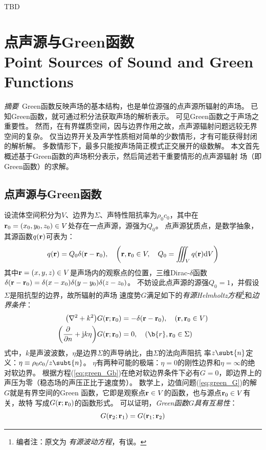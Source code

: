 \documentclass[UTF8]{ctexbook}
\begin{document}
 TBD




\section{点声源与Green函数\\
Point Sources of Sound and Green Functions}

\emph{摘要}\ 
Green函数反映声场的基本结构，也是单位源强的点声源所辐射的声场。
已知Green函数，就可通过积分法获取声场的解析表示。
可见Green函数之于声场之重要性。
然而，在有界媒质空间，因与边界作用之故，点声源辐射问题远较无界空间的复杂。
仅当边界开关及声学性质相对简单的少数情形，才有可能获得封闭的解析解。
多数情形下，最多只能按声场简正模式正交展开的级数解。
本文首先概述基于Green函数的声场积分表示，然后简述若干重要情形的点声源辐射
场（即Green函数）的求解。

\subsection{点声源与Green函数}
设流体空间积分为$V$、边界为$\Sigma$、声特性阻抗率为$\rho_0c_0$，其中在
$\vb{r}_0=(x_0,y_0,z_0)\in V$处存在一点声源，源强为$Q_0$。
点声源犹质点，是数学抽象，其源函数$q(\vb{r})$可表为：
$$q(\vb{r}) = Q_0 \delta(\vb{r}-\vb{r}_0)\qc
\qty(\vb{r},\vb{r}_0\in V\qc Q_0 = \iiint_V q(\vb{r})\dd V)$$
其中$\vb{r}=(x,y,z)\in V$是声场内的观察点的位置，三维Dirac-$\delta$函数
$\delta(\vb{r}-\vb{r}_0)= \delta(x-x_0)\delta(y-y_0)\delta(z-z_0)$。
不妨设此点声源的源强$Q_0=1$，并假设$\Sigma$是阻抗型的边界，故所辐射的声场
速度势$G$满足如下的\emph{有源Helmholtz方程}\footnote{编者注：原文为\emph{
	有源波动方程}，有误。}和\emph{边界条件}：
\begin{subequations}
	\begin{align}
		\qty(\laplacian + k^2)G(\vb{r};\vb{r}_0) & =- \delta (\vb{r}-\vb{r}_0)
		\qc \qty(\vb{r},\vb{r}_0\in V) \label{eq:green_Ga}\\
		\qty(\pdv{n} +\mj k \eta )G(\vb{r};\vb{r}_0) & = 0 
		\qc \qty(\b{r},\vb{r}_0\in \Sigma)\label{eq:green_Gb}
	\end{align}
	\label{eq:green_G}
\end{subequations}式中，$k$是声波波数，$\eta$是边界$\Sigma$的声导纳比，由$\Sigma$的法向声阻抗
率$z\subt{n}$定义：$\eta\equiv \rho_0c_0/z\subt{n}$。
$\eta$有两种可能的极端：$\eta=0$的刚性边界和$\eta=\infty$的绝对软边界。
根据方程(\ref{eq:green_Gb})在绝对软边界条件下必有$G=0$，即边界上的
声压为零（稳态场的声压正比于速度势）。
数学上，边值问题(\ref{eq:green_G})的解$G$就是有界空间的Green
函数，它即是观察点$\vb{r}\in V$的函数，也与源点$\vb{r}_0 \in V$有关，故特
写成$G(\vb{r};\vb{r}_0)$的函数形式。
可以证明，\emph{Green函数$G$具有互易性}：
$$G(\vb{r}_2;\vb{r}_1) = G(\vb{r}_1;\vb{r}_2)$$
\end{document}
